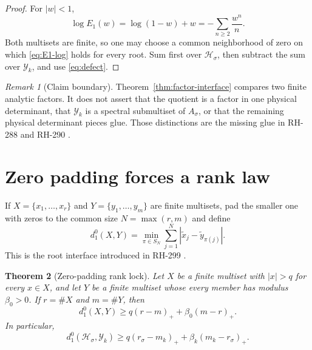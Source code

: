 \documentclass[11pt]{article}
\newtheorem{theorem}{Theorem}[section]
\theoremstyle{remark}
\newtheorem{remark}[theorem]{Remark}
\newcommand{\cH}{\mathcal H}
\newcommand{\cY}{\mathcal Y}
\begin{document}
\begin{proof}
For $|w|<1$,
\begin{equation}\label{eq:E1-log}
 \log E_1(w)=\log(1-w)+w=-\sum_{n\ge2}\frac{w^n}{n}.
\end{equation}
Both multisets are finite, so one may choose a common neighborhood of zero
on which \eqref{eq:E1-log} holds for every root.  Sum first over
$\cH_\sigma$, then subtract the sum over $\cY_k$, and use
\eqref{eq:defect}.
\end{proof}

\begin{remark}[Claim boundary]
Theorem~\ref{thm:factor-interface} compares two finite analytic factors.  It
does not assert that the quotient is a factor in one physical determinant,
that $\cY_k$ is a spectral submultiset of $A_\sigma$, or that the remaining
physical determinant pieces glue.  Those distinctions are the missing glue
in RH-288 and RH-290 \citep{WangGluing2026,WangTypedLedger2026}.
\end{remark}

\section{Zero padding forces a rank law}

If $X=\{x_1,\ldots,x_r\}$ and $Y=\{y_1,\ldots,y_m\}$ are finite multisets,
pad the smaller one with zeros to the common size $N=\max(r,m)$ and define
\begin{equation}\label{eq:padded-distance}
 d_1^0(X,Y)=\min_{\pi\in S_N}
       \sum_{j=1}^N|\widetilde x_j-\widetilde y_{\pi(j)}|.
\end{equation}
This is the root interface introduced in RH-299
\citep{WangRootTransport2026}.

\begin{theorem}[Zero-padding rank lock]
\label{thm:rank-lock}
Let $X$ be a finite multiset with $|x|>q$ for every $x\in X$, and let $Y$
be a finite multiset whose every member has modulus $\beta_0>0$.  If
$r=\#X$ and $m=\#Y$, then
\begin{equation}\label{eq:rank-lock-general}
 d_1^0(X,Y)\ge
 q(r-m)_++\beta_0(m-r)_+.
\end{equation}
In particular,
\begin{equation}\label{eq:rank-lock-physical}
 d_1^0(\cH_\sigma,\cY_k)\ge
 q(r_\sigma-m_k)_++\beta_k(m_k-r_\sigma)_+.
\end{equation}
\end{theorem}
\end{document}

